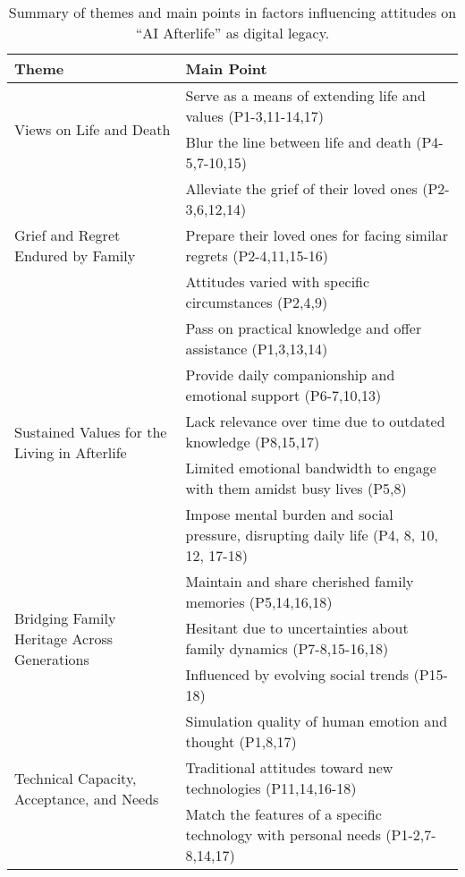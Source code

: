\begin{table*}[htbp]
  \caption{Summary of themes and main points in factors influencing attitudes on ``AI Afterlife'' as digital legacy.}
  \label{tab:factors influencing attitudes}
  \begin{tabular}{p{}p{}}
    \toprule
    \textbf{Theme} & \textbf{Main Point} \\
    \midrule
    \multirow{2}{=}{Views on Life and Death} 
            & Serve as a means of extending life and values (P1-3,11-14,17) \\ %
             & \cellcolor{gray!15} Blur the line between life and death (P4-5,7-10,15) \\
    \hline
     \multirow{3}{=}{Grief and Regret Endured by Family} 
            & Alleviate the grief of their loved ones (P2-3,6,12,14) \\ %
             & \cellcolor{gray!15} Prepare their loved ones for facing similar regrets (P2-4,11,15-16) \\ %
             & Attitudes varied with specific circumstances (P2,4,9) \\
    \hline
    \multirow{5}{=}{Sustained Values for the Living in Afterlife} 
            & \cellcolor{gray!15} Pass on practical knowledge and offer assistance (P1,3,13,14) \\ %
            & Provide daily companionship and emotional support (P6-7,10,13) \\ %
            & \cellcolor{gray!15} Lack relevance over time due to outdated knowledge (P8,15,17) \\ %
            & Limited emotional bandwidth to engage with them amidst busy lives (P5,8) \\
            & \cellcolor{gray!15} Impose mental burden and social pressure, disrupting daily life (P4, 8, 10, 12, 17-18) \\ %
    \hline
     \multirow{3}{=}{Bridging Family Heritage Across Generations} 
             & Maintain and share cherished family memories (P5,14,16,18) \\ %
             & \cellcolor{gray!15} Hesitant due to uncertainties about family dynamics (P7-8,15-16,18) \\ %
             & Influenced by evolving social trends (P15-18) \\ %
    \hline
    \multirow{3}{=}{Technical Capacity, Acceptance, and Needs} 
             & \cellcolor{gray!15} Simulation quality of human emotion and thought (P1,8,17) \\ %
             & Traditional attitudes toward new technologies (P11,14,16-18) \\ %
             & \cellcolor{gray!15} Match the features of a specific technology with personal needs (P1-2,7-8,14,17) \\
    \bottomrule
  \end{tabular}
\end{table*}

